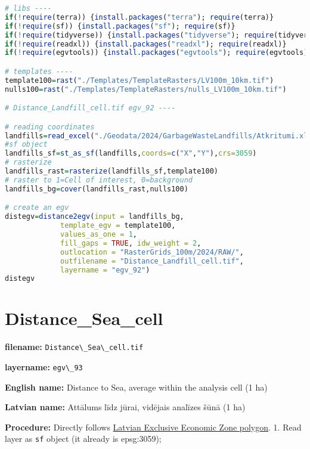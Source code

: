 \documentclass[
]{book}
\newcommand{\passthrough}[1]{#1}
\begin{document}
\begin{lstlisting}[language=R]
# libs ----
if(!require(terra)) {install.packages("terra"); require(terra)}
if(!require(sf)) {install.packages("sf"); require(sf)}
if(!require(tidyverse)) {install.packages("tidyverse"); require(tidyverse)}
if(!require(readxl)) {install.packages("readxl"); require(readxl)}
if(!require(egvtools)) {install.packages("egvtools"); require(egvtools)}

# templates ----
template100=rast("./Templates/TemplateRasters/LV100m_10km.tif")
nulls100=rast("./Templates/TemplateRasters/nulls_LV100m_10km.tif")

# Distance_Landfill_cell.tif egv_92 ----

# reading coordinates
landfills=read_excel("./Geodata/2024/GarbageWasteLandfills/Atkritumi.xlsx",sheet="Poligoni")
#sf object
landfills_sf=st_as_sf(landfills,coords=c("X","Y"),crs=3059)
# rasterize
landfills_rast=rasterize(landfills_sf,template100)
# raster to 1=Cell of interest, 0=background
landfills_bg=cover(landfills_rast,nulls100)

# create an egv
distegv=distance2egv(input = landfills_bg,
             template_egv = template100,
             values_as_one = 1,
             fill_gaps = TRUE, idw_weight = 2,
             outlocation = "RasterGrids_100m/2024/RAW/",
             outfilename = "Distance_Landfill_cell.tif",
             layername = "egv_92")
distegv
\end{lstlisting}

\section{Distance\_Sea\_cell}\label{ch06.093}

\textbf{filename:} \passthrough{\lstinline!Distance\_Sea\_cell.tif!}

\textbf{layername:} \passthrough{\lstinline!egv\_93!}

\textbf{English name:} Distance to Sea, average within the analysis cell (1 ha)

\textbf{Latvian name:} Attālums līdz jūrai, vidējais analīzes šūnā (1 ha)

\textbf{Procedure:} Directly follows \hyperref[Ch04.16]{Latvian Exclusive Economic Zone polygon}.
1. Read layer as \passthrough{\lstinline!sf!} object (it already is epsg:3059);
\end{document}

